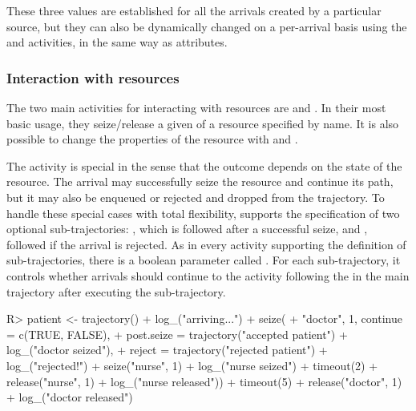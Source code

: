 \documentclass[
  nojss]{jss}
\begin{document}
These three values are established for all the arrivals created by a
particular source, but they can also be dynamically changed on a
per-arrival basis using the  and
 activities, in the same way as attributes.

\hypertarget{interaction-with-resources}{%
\subsubsection{Interaction with
resources}\label{interaction-with-resources}}

The two main activities for interacting with resources are
 and . In their most basic usage, they
seize/release a given  of a resource specified by name. It
is also possible to change the properties of the resource with
 and .

The  activity is special in the sense that the outcome
depends on the state of the resource. The arrival may successfully seize
the resource and continue its path, but it may also be enqueued or
rejected and dropped from the trajectory. To handle these special cases
with total flexibility,  supports the specification of two
optional sub-trajectories: , which is followed after a
successful seize, and , followed if the arrival is
rejected. As in every activity supporting the definition of
sub-trajectories, there is a boolean parameter called .
For each sub-trajectory, it controls whether arrivals should continue to
the activity following the  in the main trajectory after
executing the sub-trajectory.

\begin{CodeChunk}
\begin{CodeInput}
R> patient <- trajectory() %
+   log_("arriving...") %
+   seize(
+     "doctor", 1, continue = c(TRUE, FALSE),
+     post.seize = trajectory("accepted patient") %
+       log_("doctor seized"),
+     reject = trajectory("rejected patient") %
+       log_("rejected!") %
+       seize("nurse", 1) %
+       log_("nurse seized") %
+       timeout(2) %
+       release("nurse", 1) %
+       log_("nurse released")) %
+   timeout(5) %
+   release("doctor", 1) %
+   log_("doctor released")
\end{CodeInput}
\end{CodeChunk}
\end{document}
